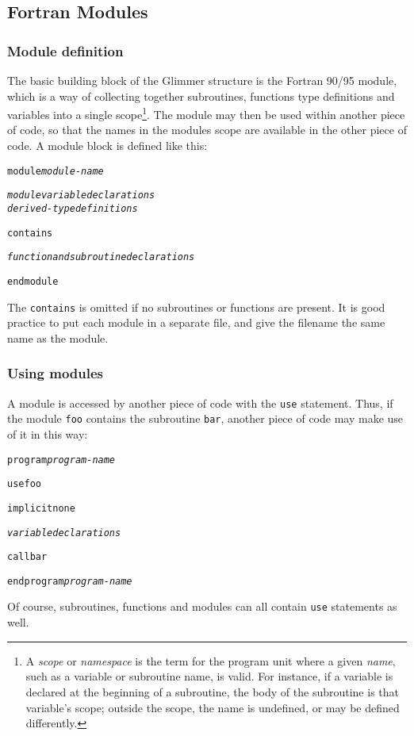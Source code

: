 \subsection{Fortran Modules}
%
\subsubsection{Module definition}
%
The basic building block of the Glimmer structure is the Fortran 90/95 module,
which is a way of collecting together subroutines, functions type definitions
and variables into a single scope\footnote{A \emph{scope} or \emph{namespace}
 is the term for the program unit where a given \emph{name}, such as a variable
 or subroutine name, is valid. For instance, if a variable is declared at the
 beginning of a subroutine, the body of the subroutine is that variable's
 scope; outside the scope, the name is undefined, or may be defined
 differently.}. The module may then be used within another piece of code, so that the
names in the modules scope are available in the other piece of code. A module
block is defined like this:
%
\begin{alltt}
    module \textrm{\textit{module-name}}

        \textrm{\textit{module variable declarations}}
        \textrm{\textit{derived-type definitions}}

    contains

        \textrm{\textit{function and subroutine declarations}}

    end module
\end{alltt}
%
The \texttt{contains} is omitted if no subroutines or functions are
present. It is good practice to put each module in a separate file, and give
the filename the same name as the module.
%
\subsubsection{Using modules}
%
A module is accessed by another piece of code with the \texttt{use}
statement. Thus, if the module \texttt{foo} contains the subroutine
\texttt{bar}, another piece of code may make use of it in this way:
%
\begin{alltt}
    program \textrm{\textit{program-name}}

        use foo

        implicit none

        \textrm{\textit{variable declarations}}

        call bar

    end program \textrm{\textit{program-name}}
\end{alltt}
%
Of course, subroutines, functions and modules can all contain \texttt{use}
statements as well.
%
